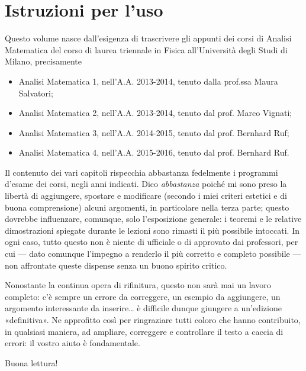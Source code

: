 \chapter{Istruzioni per l'uso}
Questo volume nasce dall'esigenza di trascrivere gli appunti dei corsi di Analisi Matematica del corso di laurea triennale in Fisica all'Università degli Studi di Milano, precisamente
\begin{itemize}
\item Analisi Matematica 1, nell'A.A. 2013-2014, tenuto dalla prof.ssa Maura Salvatori;
\item Analisi Matematica 2, nell'A.A. 2013-2014, tenuto dal prof. Marco Vignati;
\item Analisi Matematica 3, nell'A.A. 2014-2015, tenuto dal prof. Bernhard Ruf;
\item Analisi Matematica 4, nell'A.A. 2015-2016, tenuto dal prof. Bernhard Ruf.
\end{itemize}
Il contenuto dei vari capitoli rispecchia abbastanza fedelmente i programmi d'esame dei corsi, negli anni indicati.
Dico \emph{abbastanza} poich\'e mi sono preso la libertà di aggiungere, spostare e modificare (secondo i miei criteri estetici e di buona comprensione) alcuni argomenti, in particolare nella terza parte; questo dovrebbe influenzare, comunque, solo l'esposizione generale: i teoremi e le relative dimostrazioni spiegate durante le lezioni sono rimasti il più possibile intoccati.
In ogni caso, tutto questo non è niente di ufficiale o di approvato dai professori, per cui --- dato comunque l'impegno a renderlo il più corretto e completo possibile --- non affrontate queste dispense senza un buono spirito critico.

Nonostante la continua opera di rifinitura, questo non sarà mai un lavoro completo: c'è sempre un errore da correggere, un esempio da aggiungere, un argomento interessante da inserire\ldots{} è difficile dunque giungere a un'edizione «definitiva».
Ne approfitto cos\`i per ringraziare tutti coloro che hanno contribuito, in qualsiasi maniera, ad ampliare, correggere e controllare il testo a caccia di errori: il vostro aiuto è fondamentale.

Buona lettura!

